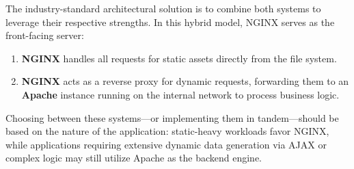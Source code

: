 \documentclass{scrbook}
\begin{document}
	The industry-standard architectural solution is to combine both systems to leverage their respective strengths. In this hybrid model, NGINX serves as the front-facing server:
	
	\begin{enumerate}
	    \item \textbf{NGINX} handles all requests for static assets directly from the file system.
	    \item \textbf{NGINX} acts as a reverse proxy for dynamic requests, forwarding them to an \textbf{Apache} instance running on the internal network to process business logic.
	\end{enumerate}
	
	Choosing between these systems---or implementing them in tandem---should be based on the nature of the application: static-heavy workloads favor NGINX, while applications requiring extensive dynamic data generation via AJAX or complex logic may still utilize Apache as the backend engine.
\end{document}
